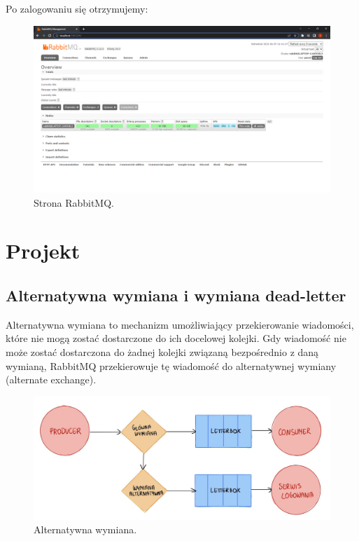 \documentclass[12pt,twoside]{article}
\begin{document}
Po zalogowaniu się otrzymujemy:
\begin{figure}[!htb]
	\centering
	\includegraphics[width=1\textwidth]{figures/fig8.png}
	\caption{Strona RabbitMQ.}
	\label{fig:zdjecie}
\end{figure}

\section{Projekt}
\subsection{Alternatywna wymiana i wymiana dead-letter}
Alternatywna wymiana to mechanizm umożliwiający przekierowanie wiadomości, które nie mogą zostać dostarczone do ich docelowej kolejki. Gdy wiadomość nie może zostać dostarczona do żadnej kolejki związaną bezpośrednio z daną wymianą, RabbitMQ przekierowuje tę wiadomość do alternatywnej wymiany (alternate exchange).
\clearpage

\begin{figure}[!htb]
	\centering
	\includegraphics[angle=90,width=1\textwidth]{figures/fig10.png}
	\caption{Alternatywna wymiana.}
	\label{fig:zdjecie}
\end{figure}
\end{document}
